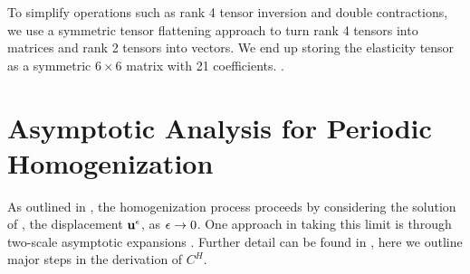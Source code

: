 \documentclass[twocolumn,10pt]{article}
\begin{document}
To simplify operations such as rank 4 tensor inversion and double
contractions, we use a symmetric tensor flattening approach to turn
rank 4 tensors into matrices and rank 2 tensors into vectors. We end
up storing the elasticity tensor as a symmetric $6\times 6$ matrix
with 21 coefficients. .

\appendix
\section{Asymptotic Analysis for Periodic Homogenization\label{apx:asymptotic}}
As outlined in , the homogenization process proceeds
by considering the solution of , the displacement
$\mathbf u^\epsilon$, as $\epsilon\to 0$. One approach in taking this limit is through
two-scale asymptotic expansions \cite{allaire2002shape}. Further
detail can be found in
\cite{allaire2002shape,allaire1992homogenization}, here we outline
major steps in the derivation of $C^H$.
\end{document}
